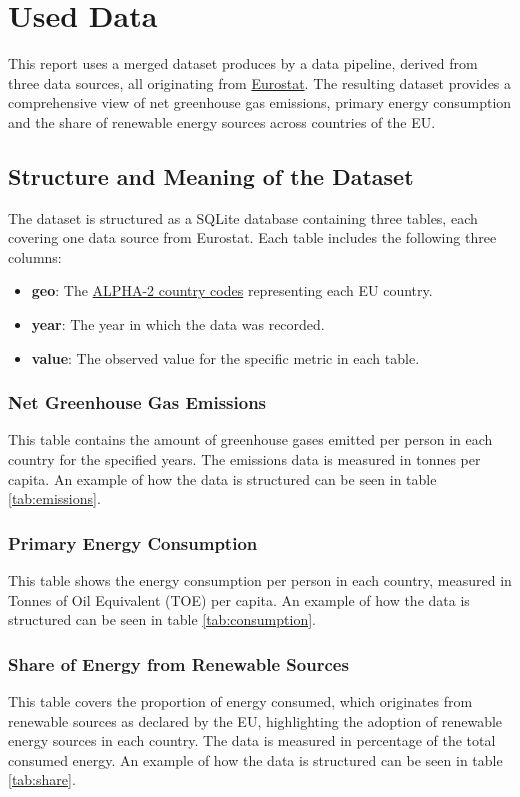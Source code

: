 \documentclass{article}
\begin{document}
\section*{Used Data}
This report uses a merged dataset produces by a data pipeline, derived from three data sources,
all originating from \href{https://ec.europa.eu/eurostat}{Eurostat}.
The resulting dataset provides a comprehensive view of net greenhouse gas emissions, primary energy consumption
and the share of renewable energy sources across countries of the EU.

\subsection*{Structure and Meaning of the Dataset}
The dataset is structured as a SQLite database containing three tables, each covering one data source from Eurostat.
Each table includes the following three columns:
\begin{itemize}
    \item \textbf{geo}: The \href{https://www.destatis.de/Europa/EN/Country/Country-Codes.html}{ALPHA-2 country codes} representing each EU country.
    \item \textbf{year}: The year in which the data was recorded.
    \item \textbf{value}: The observed value for the specific metric in each table.
\end{itemize}

\subsubsection*{Net Greenhouse Gas Emissions}
This table contains the amount of greenhouse gases emitted per person in each country for the specified years.
The emissions data is measured in tonnes per capita.
An example of how the data is structured can be seen in table \ref{tab:emissions}.

\subsubsection*{Primary Energy Consumption}
This table shows the energy consumption per person in each country, measured in Tonnes of Oil Equivalent (TOE) per capita.
An example of how the data is structured can be seen in table \ref{tab:consumption}.

\subsubsection*{Share of Energy from Renewable Sources}
This table covers the proportion of energy consumed, which originates from renewable sources as declared by the EU,
highlighting the adoption of renewable energy sources in each country.
The data is measured in percentage of the total consumed energy.
An example of how the data is structured can be seen in table \ref{tab:share}.
\end{document}
